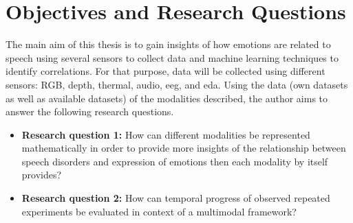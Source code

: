 \begin{comment}
The same setting could also be applied to patients with facial paralysis, caused by nerve damage. It usually occurs on only one side of the face and can have different degrees of severity which cause difficulty not only in speaking but also in eating and drinking. Although there are more than twenty grading methods of the severity of facial paralysis, they have defaults in integration, feasibility, accuracy, and reliability \cite{Dong2008}. The development of an accurate method for detection and grading of facial paralysis based on image processing would be beneficial to clinicians and patients.


For both, speech therapy and facial paralysis therapy, treatment takes several months of therapy sessions in which various exercises are performed to improve weakness in oral musculature. The video monitoring during therapy combined with the analysis of face muscle performance could help therapists to follow up the progress of each patient, compare patients with similar problems and even provide therapists with quantitative measurements. The inclusion of affective computing in the face analysis system, would accquire additional information of the patient's degree of engagement during the exercises being an additional factor to a successful therapy. Through the use of different sources of data such as health records, a multimodal time series of observations is used to develop a clinical decision support system that supports therapists in providing personalized therapies.

\end{comment}


\section{Objectives and Research Questions}

The main aim of this thesis is to gain insights of how emotions are related to speech using several sensors to collect data and machine learning techniques to identify correlations. For that purpose, data will be collected using different sensors: RGB, depth, thermal, audio, \gls{eeg}, and \gls{eda}. Using the data (own datasets as well as available datasets) of the modalities described, the author aims to answer the following research questions.

\begin{itemize}
    \item\textbf{Research question 1:} How can different modalities be represented mathematically in order to provide more insights of the relationship between speech disorders and expression of emotions then each modality by itself provides?

    \item\textbf{Research question 2:} How can temporal progress of observed repeated experiments be evaluated in context of a multimodal framework?
    
\end{itemize}


